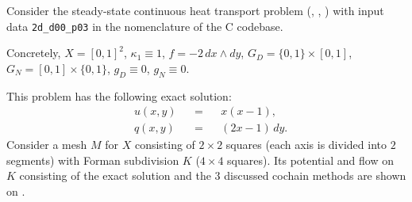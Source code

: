 \begin{example}
  Consider the steady-state continuous heat transport problem
  (,
   ,
   )
  with input data \verb|2d_d00_p03| in the nomenclature of the C codebase.

  Concretely,
    $X = [0, 1]^2$,
    $\kappa_1 \equiv 1$,
    $f = -2 \, d x \wedge d y$,
    $G_D = \{0, 1\} \times [0, 1]$,
    $G_N = [0, 1] \times \{0, 1\}$,
    $g_D \equiv 0$,
    $g_N \equiv 0$.

  This problem has the following exact solution:
  \begin{subequations}
    \begin{alignat}{3}
      & u(x, y) && = && x (x - 1), \\
      & q(x, y) && = && (2 x - 1)\, d y.
    \end{alignat}
  \end{subequations}
  Consider a mesh $M$ for $X$ consisting of $2 \times 2$ squares (each axis is
  divided into $2$ segments) with Forman subdivision $K$ ($4 \times 4$ squares).
  Its potential and flow on $K$ consisting of the exact solution and the $3$
  discussed cochain methods are shown on
  .
\end{example}
